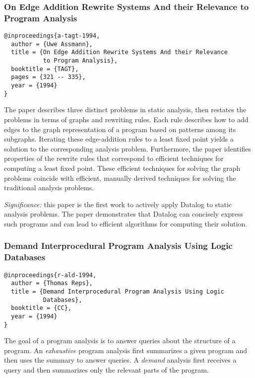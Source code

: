 \documentclass{article}
\begin{document}
\newpage
\subsubsection*{On Edge Addition Rewrite Systems And their Relevance to Program Analysis}
\begin{verbatim}
@inproceedings{a-tagt-1994,
  author = {Uwe Assmann},
  title = {On Edge Addition Rewrite Systems And their Relevance
           to Program Analysis},
  booktitle = {TAGT},
  pages = {321 -- 335},
  year = {1994}
}
\end{verbatim}

The paper describes three distinct problems in static analysis, then restates the problems in terms of graphs and rewriting rules.
Each rule describes how to add edges to the graph representation of a program based on patterns among its subgraphs.
Iterating these edge-addition rules to a least fixed point yields a solution to the corresponding analysis problem.
Furthermore, the paper identifies properties of the rewrite rules that correspond to efficient techniques for computing a least fixed point.
These efficient techniques for solving the graph problems coincide with efficient, manually derived techniques for solving the traditional analysis problems.

\emph{Significance:} this paper is the first work to actively apply Datalog to static analysis problems.
The paper demonstrates that Datalog can concisely express such programs and can lead to efficient algorithms for computing their solution.


\newpage
\subsubsection*{Demand Interprocedural Program Analysis Using Logic Databases}
\begin{verbatim}
@inproceedings{r-ald-1994,
  author = {Thomas Reps},
  title = {Demand Interprocedural Program Analysis Using Logic
           Databases},
  booktitle = {CC},
  year = {1994}
}
\end{verbatim}

The goal of a program analysis is to answer queries about the structure of a program.
An \emph{exhaustive} program analysis first summarizes a given program and then uses the summary to answer queries.
A \emph{demand} analysis first receives a query and then summarizes only the relevant parts of the program.
\end{document}
